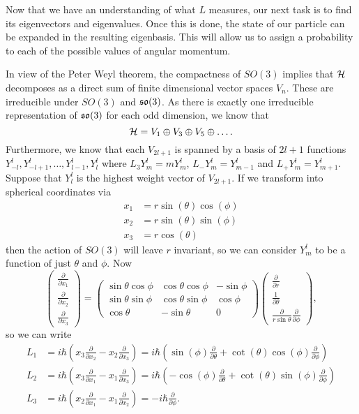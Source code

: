 \documentclass[a4paper]{article}
\begin{document}
Now that we have an understanding of what $L$ measures, our next task is to find its eigenvectors and eigenvalues. Once this is done, the state of our particle can be expanded in the resulting eigenbasis. This will allow us to assign a probability to each of the possible values of angular momentum. 

In view of the Peter Weyl theorem, the compactness of $SO(3)$ implies that $\mathcal{H}$ decomposes as a direct sum of finite dimensional vector spaces $V_n$. These are irreducible under $SO(3)$ and $\mathfrak{so}(3)$. As there is exactly one irreducible representation of $\mathfrak{so}(3)$ for each odd dimension, we know that 
$$\mathcal{H} = V_1 \oplus V_3 \oplus V_5 \oplus \hdots.$$
Furthermore, we know that each $V_{2l+1}$ is spanned by a basis of $2l+1$ functions $Y^l_{-l}, Y^l_{-l + 1}, \hdots, Y^l_{l-1}, Y^l_{l}$ where $L_3 Y^l_{m} = m Y^l_{m}$, $L_{-} Y^l_{m} = Y^l_{m-1}$ and $L_{+} Y^l_{m} = Y^l_{m+1}$. 
Suppose that $Y^l_{l}$ is the highest weight vector of $V_{2l+1}$. If we transform into spherical coordinates via
\begin{align*}
    x_1&=r\sin(\theta)\cos(\phi)\\
    x_2&=r\sin(\theta)\sin(\phi)\\
    x_3&=r\cos(\theta)
\end{align*}
then the action of $SO(3)$ will leave $r$ invariant, so we can consider $Y^l_{m}$ to be a function of just $\theta$ and $\phi$. Now 
$$\left(
    \begin{array}{c}
    \frac{\partial}{\partial x_{1}} \\
    \frac{\partial}{\partial x_{2}} \\
    \frac{\partial}{\partial x_{3}}
    \end{array}\right)=\left(\begin{array}{ccc}
    \sin \theta \cos \phi & \cos \theta \cos \phi & -\sin \phi \\
    \sin \theta \sin \phi & \cos \theta \sin \phi & \cos \phi \\
    \cos \theta & -\sin \theta & 0
    \end{array}\right)\left(\begin{array}{c}
    \frac{\partial}{\partial r} \\
    \frac{1}{\partial \theta} \\
    \frac{\partial}{r \sin \theta} \frac{\partial}{\partial \phi}
    \end{array}
\right),$$
so we can write 
\begin{align*}
    L_1 &= i\hbar\left(x_3\frac{\partial}{\partial x_2} - x_2\frac{\partial}{\partial x_3}\right) = i\hbar\left(\sin(\phi)\frac{\partial}{\partial \theta} + \cot(\theta)\cos(\phi)\frac{\partial}{\partial \phi}\right)\\
    L_2 &= i\hbar\left(x_3\frac{\partial}{\partial x_1} - x_1\frac{\partial}{\partial x_3}\right) = i\hbar\left(-\cos(\phi)\frac{\partial}{\partial \theta} + \cot(\theta)\sin(\phi)\frac{\partial}{\partial \phi}\right)\\
    L_3 &= i\hbar\left(x_2\frac{\partial}{\partial x_1} - x_1\frac{\partial}{\partial x_2}\right) = -i\hbar \frac{\partial}{\partial \phi}.
\end{align*}
\end{document}
